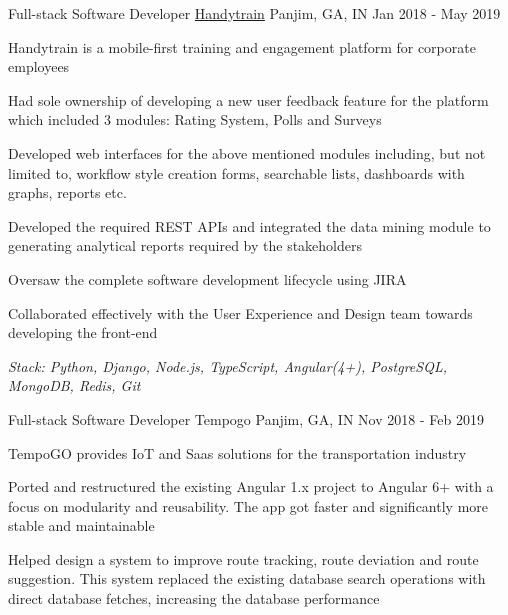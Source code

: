 \begin{cventries}
    \cventry
    {Full-stack Software Developer} %
    {\href{https://www.handytrain.com}{Handytrain\acvHeaderIconSep\faExternalLink}} %
    {Panjim, GA, IN} %
    {Jan 2018 - May 2019} %
    {
        \begin{cvitems} %
            \item {Handytrain is a mobile-first training and engagement platform for corporate employees}
            \item {Had sole ownership of developing a new user feedback feature for the platform which included 3 modules: Rating System, Polls and Surveys}
            \item {Developed web interfaces for the above mentioned modules including, but not limited to, workflow style creation forms, searchable lists, dashboards with graphs, reports etc.}
            \item {Developed the required REST APIs and integrated the data mining module to generating analytical reports required by the stakeholders}
            \item {Oversaw the complete software development lifecycle using JIRA}
            \item {Collaborated effectively with the User Experience and Design team towards developing the front-end}
            \item \textit{Stack: Python, Django, Node.js, TypeScript, Angular(4+), PostgreSQL, MongoDB, Redis, Git}
        \end{cvitems}
    }

    \cventry
    {Full-stack Software Developer} %
    {Tempogo} %
    {Panjim, GA, IN} %
    {Nov 2018 - Feb 2019} %
    {
        \begin{cvitems} %
            \item {TempoGO provides IoT and Saas solutions for the transportation industry}
            \item {Ported and restructured the existing Angular 1.x project to Angular 6+ with a focus on modularity and reusability. The app got faster and significantly more stable and maintainable}
            \item {Helped design a system to improve route tracking, route deviation and route suggestion. This system replaced the existing database search operations with direct database fetches, increasing the database performance}
        \end{cvitems}
    }


\end{cventries}
